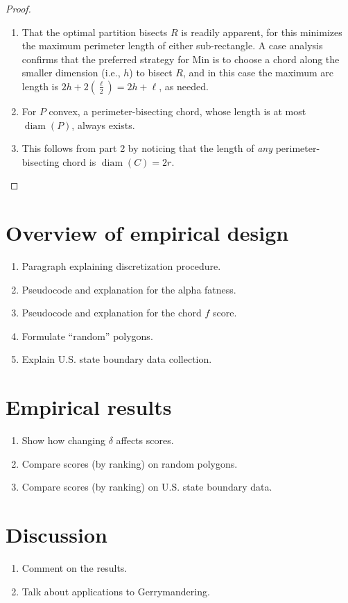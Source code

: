 \documentclass[draft]{jocg}
\DeclareMathOperator{\diam}{\mathrm{diam}}
\theoremstyle{definition}
\theoremstyle{remark}
\begin{document}
\begin{proof}
  \begin{enumerate}
    \item That the optimal partition bisects $R$ is readily apparent,
      for this minimizes the maximum perimeter length of either sub-rectangle.
      A case analysis confirms that the preferred strategy for Min is to choose
      a chord along the smaller dimension (i.e., $h$) to bisect $R$, and in this
      case the maximum arc length is $2h + 2\left( \frac{\ell}{2} \right) = 2h +
      \ell$, as needed.
    \item For $P$ convex, a perimeter-bisecting chord, whose length is at most
      $\diam(P)$, always exists. 
    \item This follows from part 2 by noticing that the length of \emph{any}
      perimeter-bisecting chord is $\diam(C) = 2r$. \qedhere
  \end{enumerate}
\end{proof}

\section{Overview of empirical design}

\begin{enumerate}
  \item Paragraph explaining discretization procedure.
  \item Pseudocode and explanation for the alpha fatness.
  \item Pseudocode and explanation for the chord $f$ score.
  \item Formulate ``random'' polygons.
  \item Explain U.S. state boundary data collection.
\end{enumerate}

\section{Empirical results}

\begin{enumerate}
  \item Show how changing $\delta$ affects scores.
  \item Compare scores (by ranking) on random polygons.
  \item Compare scores (by ranking) on U.S. state boundary data.
\end{enumerate}

\section{Discussion}

\begin{enumerate}
  \item Comment on the results.\cite{cgal:eb-18a}
  \item Talk about applications to Gerrymandering.\cite{cgal:gw-p2-18a}
\end{enumerate}

\medskip

\printbibliography[heading=bibintoc]
\end{document}

